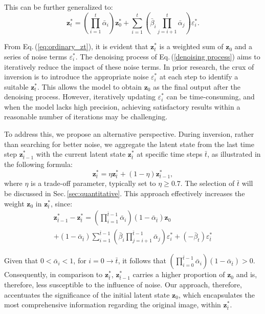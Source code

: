 \documentclass[letterpaper]{article} %
\begin{document}
This can be further generalized to:
\begin{equation}\label{eq:ordinary_zt}
\mathbf{z}^*_{t} = (\prod_{i=1}^{t}\bar\alpha_i)\mathbf{z}^*_{0} + \sum_{i=1}^{t}(\bar\beta_i\prod_{j = i+1}^{t}\bar\alpha_j)\varepsilon^*_i.
\end{equation}



From Eq.\,(\ref{eq:ordinary_zt}), it is evident that $\mathbf{z}^*_{t}$ is a weighted sum of $\mathbf{z}_{0}$ and a series of noise terms $\varepsilon^*_i$. The denoising process of Eq.\,(\ref{denoising process}) aims to iteratively reduce the impact of these noise terms. In prior research, the crux of inversion is to introduce the appropriate noise $\varepsilon^*_i$ at each step to identify a suitable $\mathbf{z}^*_{t}$. This allows the model to obtain $\mathbf{z}_{0}$ as the final output after the denoising process. However, iteratively updating $\varepsilon^*_i$ can be time-consuming, and when the model lacks high precision,  achieving satisfactory results within a reasonable number of iterations may be challenging.


To address this, we propose an alternative perspective. During inversion, rather than searching for better noise, we aggregate the latent state from the last time step $\mathbf{z}^*_{\bar{t}-1}$ with the current latent state $\mathbf{z}^*_{\bar{t}}$ at specific time steps $\bar{t}$, as illustrated in the following formula:
\begin{equation}\label{eq:inject}
\mathbf{z}^*_{\bar{t}}=\eta  \mathbf{z}^*_{\bar{t}} + (1-\eta)  \mathbf{z}^*_{{\bar{t}-1}},
\end{equation}
where $\eta$ is a trade-off parameter, typically set to $\eta \geq 0.7$. The selection of $\bar{t}$ will be discussed in Sec.\,\ref{sec:quantitative}. This approach effectively increases the weight $\mathbf{z}_{0}$ in $\mathbf{z}^*_{\bar{t}}$, since:
\begin{equation}\label{eq:prove}
\begin{split}
\mathbf{z}^*_{{\bar{t}-1}} - \mathbf{z}^*_{\bar{t}} = (\prod_{i=1}^{\bar{t}-1}\bar\alpha_i)(1 - \bar\alpha_{\bar{t}})\mathbf{z}_{0} \\+ (1 - \bar\alpha_{\bar{t}})\sum_{i=1}^{\bar{t}-1}(\bar\beta_i\prod_{j = i+1}^{\bar{t}-1}\bar\alpha_j)\varepsilon^*_i + (-\bar\beta_{t})\varepsilon^*_{\bar{t}}
\end{split}
\end{equation}


Given that $0 < \bar\alpha_i < 1$, for $ i = 0 \rightarrow \bar{t}$, it follows that $(\prod_{i=0}^{\bar{t}-1}\bar\alpha_i)(1 - \bar\alpha_{\bar{t}}) > 0$. Consequently, in comparison to \(\mathbf{z}^*_{\bar{t}}\), \(\mathbf{z}^*_{\bar{t}-1}\) carries a higher proportion of \(\mathbf{z}_0\) and is, therefore, less susceptible to the influence of noise. Our approach, therefore, accentuates the significance of the initial latent state \(\mathbf{z}_0\), which encapsulates the most comprehensive information regarding the original image, within \(\mathbf{z}^*_{\bar{t}}\).
\end{document}
